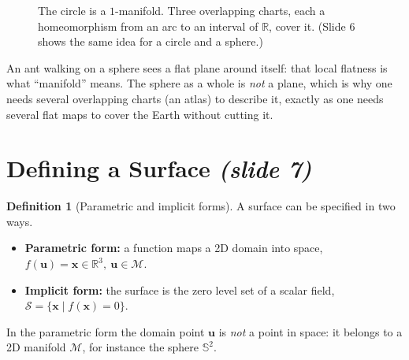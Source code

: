\documentclass[11pt,a4paper]{article}
\newcommand{\R}{\mathbb{R}}
\newcommand{\Sph}{\mathbb{S}}
\newcommand{\M}{\mathcal{M}}
\newcommand{\Surf}{\mathcal{S}}
\newcommand{\vx}{\bm{x}}
\newcommand{\vu}{\bm{u}}
\theoremstyle{definition}
\newtheorem{definition}{Definition}[section]
\theoremstyle{plain}
\theoremstyle{remark}
\newcommand{\slides}[1]{\texorpdfstring{\emph{(#1)}}{(#1)}}
\begin{document}
\begin{figure}[ht]
\centering
{}
\caption{The circle is a $1$-manifold. Three overlapping charts, each a homeomorphism from an arc to an interval of $\R$, cover it. (Slide 6 shows the same idea for a circle and a sphere.)}
\end{figure}

\begin{intuition}
An ant walking on a sphere sees a flat plane around itself: that local flatness is what ``manifold'' means. The sphere as a whole is \emph{not} a plane, which is why one needs several overlapping charts (an atlas) to describe it, exactly as one needs several flat maps to cover the Earth without cutting it.
\end{intuition}

\section{Defining a Surface \slides{slide 7}}

\begin{definition}[Parametric and implicit forms]
A surface can be specified in two ways.
\begin{itemize}[nosep]
\item \textbf{Parametric form:} a function maps a 2D domain into space,
$f(\vu)=\vx\in\R^3,\ \vu\in\M$.
\item \textbf{Implicit form:} the surface is the zero level set of a scalar field, $\Surf=\{\vx\mid f(\vx)=0\}$.
\end{itemize}
In the parametric form the domain point $\vu$ is \emph{not} a point in space: it belongs to a 2D manifold $\M$, for instance the sphere $\Sph^2$.
\end{definition}
\end{document}

